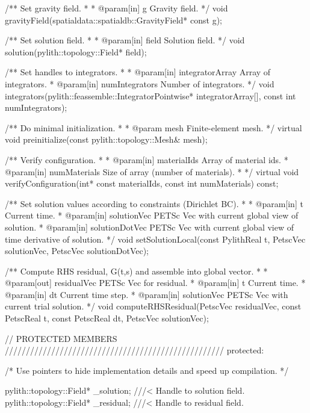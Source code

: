 \begin{cplusplus}
{    /** Set gravity field.
     *
     * @param[in] g Gravity field.
     */
    void gravityField(spatialdata::spatialdb::GravityField* const g);

    /** Set solution field.
     *
     * @param[in] field Solution field.
     */
    void solution(pylith::topology::Field* field);

    /** Set handles to integrators.
     *
     * @param[in] integratorArray Array of integrators.
     * @param[in] numIntegrators Number of integrators.
     */
    void integrators(pylith::feassemble::IntegratorPointwise* integratorArray[],
                     const int numIntegrators);

    /** Do minimal initialization.
     *
     * @param mesh Finite-element mesh.
     */
    virtual
    void preinitialize(const pylith::topology::Mesh& mesh);

    /** Verify configuration.
     *
     * @param[in] materialIds Array of material ids.
     * @param[in] numMaterials Size of array (number of materials).
     *
     */
    virtual
    void verifyConfiguration(int* const materialIds,
                             const int numMaterials) const;

    /** Set solution values according to constraints (Dirichlet BC).
     *
     * @param[in] t Current time.
     * @param[in] solutionVec PETSc Vec with current global view of solution.
     * @param[in] solutionDotVec PETSc Vec with current global view of time derivative of solution.
     */
    void setSolutionLocal(const PylithReal t,
                          PetscVec solutionVec,
                          PetscVec solutionDotVec);

    /** Compute RHS residual, G(t,s) and assemble into global vector.
     *
     * @param[out] residualVec PETSc Vec for residual.
     * @param[in] t Current time.
     * @param[in] dt Current time step.
     * @param[in] solutionVec PETSc Vec with current trial solution.
     */
    void computeRHSResidual(PetscVec residualVec,
                            const PetscReal t,
                            const PetscReal dt,
                            PetscVec solutionVec);

    // PROTECTED MEMBERS ////////////////////////////////////////////////////
protected:

    /* Use pointers to hide implementation details and speed up compilation.
     */

    pylith::topology::Field* _solution;   ///< Handle to solution field.
    pylith::topology::Field* _residual; ///< Handle to residual field.

}
\end{cplusplus}
